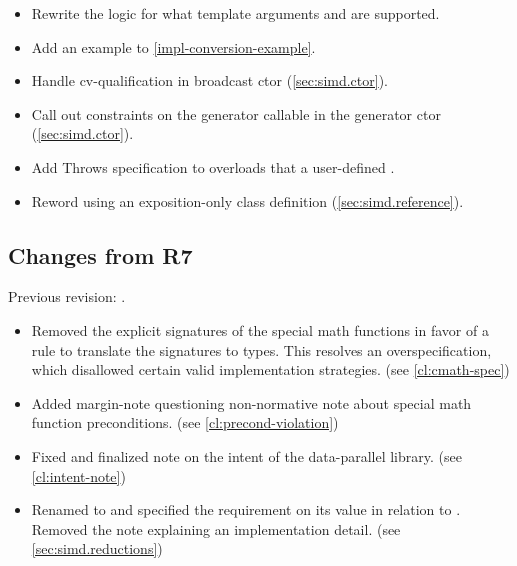 \begin{itemize}
  \item Rewrite the logic for what template arguments \simd and \mask are supported.

  \item Add an example to \ref{impl-conversion-example}.

  \item Handle cv-qualification in broadcast ctor (\ref{sec:simd.ctor}).

  \item Call out constraints on the generator callable in the generator ctor (\ref{sec:simd.ctor}).

  \item Add Throws specification to  overloads that a user-defined .

  \item Reword  using an exposition-only class definition (\ref{sec:simd.reference}).
\end{itemize}

\subsection{Changes from R7}
Previous revision: \parencite{P0214R7}.
\begin{itemize}
  \item Removed the explicit signatures of the special math functions in favor of a rule to translate the  signatures to \simd types.
    This resolves an overspecification, which disallowed certain valid implementation strategies. (see \ref{cl:cmath-spec})

  \item Added margin-note questioning non-normative note about special math function preconditions. (see \ref{cl:precond-violation})

  \item Fixed and finalized note on the intent of the data-parallel library. (see \ref{cl:intent-note})

  \item Renamed  to  and specified the requirement on its value in relation to . Removed the note explaining an implementation detail. (see \ref{sec:simd.reductions})
\end{itemize}

